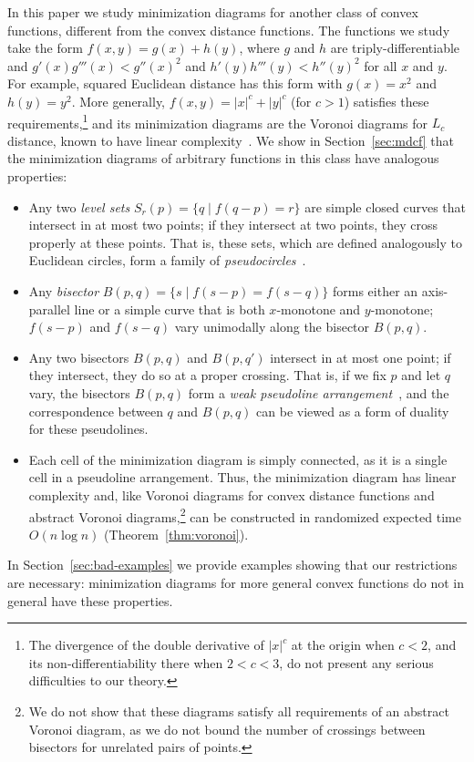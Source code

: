 \documentclass[10pt, conference, compsocconf]{IEEEtran}
\begin{document}
In this paper we study minimization diagrams for another class of convex functions, different from the convex distance functions. The functions we study take the form $f(x,y)=g(x)+h(y)$, where $g$ and $h$ are triply-differentiable and $g'(x)g'''(x) < g''(x)^2$ and $h'(y)h'''(y) < h''(y)^2$ for all $x$ and $y$. For example, squared Euclidean distance has this form with $g(x)=x^2$ and $h(y)=y^2$. More generally, $f(x,y)=|x|^c+|y|^c$ (for $c>1$) satisfies these requirements,\footnote{The divergence of the double derivative of $|x|^c$ at the origin when $c<2$, and its non-differentiability there when $2<c<3$, do not present any serious difficulties to our theory.} and its minimization diagrams are the Voronoi diagrams for $L_c$ distance, known to have linear complexity~\cite{CheDry-SoCG-85}. We show in Section~\ref{sec:mdcf} that the minimization diagrams of arbitrary functions in this class have analogous properties:
\begin{itemize}
\item Any two \emph{level sets} $S_r(p)=\{q\mid f(q-p)=r\}$ are simple closed curves that intersect in at most two points; if they intersect at two points, they cross properly at these points. That is, these sets, which are defined analogously to Euclidean circles, form a family of \emph{pseudocircles}~\cite{KedLivPac-DCG-86,LinOrt-BAG-05}.
\item Any \emph{bisector} $B(p,q)=\{s\mid f(s-p)=f(s-q)\}$ forms either an axis-parallel line or a simple curve that is both $x$-monotone and $y$-monotone; $f(s-p)$ and $f(s-q)$ vary unimodally along the bisector $B(p,q)$.
\item Any two bisectors $B(p,q)$ and $B(p,q')$ intersect in at most one point; if they intersect, they do so at a proper crossing. That is, if we fix $p$ and let $q$ vary, the bisectors $B(p,q)$ form a \emph{weak pseudoline arrangement}~\cite{Epp-GD-04,EppFalOvc-07,FraOss-GD-03}, and the correspondence between $q$ and $B(p,q)$ can be viewed as a form of duality for these pseudolines.
\item Each cell of the minimization diagram is simply connected, as it is a single cell in a pseudoline arrangement. Thus, the minimization diagram has linear complexity and, like Voronoi diagrams for convex distance functions and abstract Voronoi diagrams,\footnote{We do not show that these diagrams satisfy all requirements of an abstract Voronoi diagram, as we do not bound the number of crossings between bisectors for unrelated pairs of points.} can be constructed in randomized expected time $O(n\log n)$ (Theorem~\ref{thm:voronoi}).
\end{itemize}
In Section~\ref{sec:bad-examples} we provide examples showing that our restrictions are necessary: minimization diagrams for more general convex functions do not in general have these properties.
\end{document}
